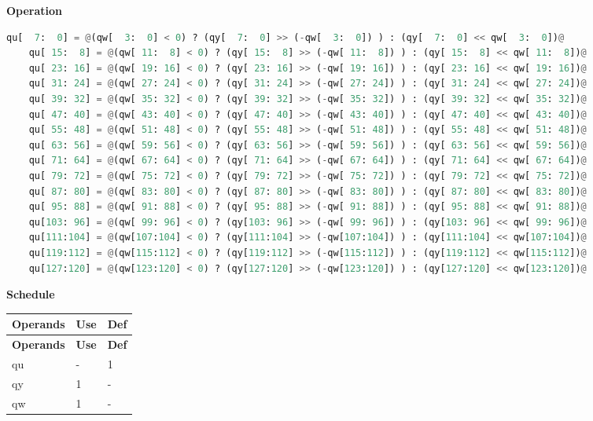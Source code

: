 \textbf{Operation}\\
\begin{lstlisting}[language=Python, escapechar=@]
    qu[  7:  0] = @(qw[  3:  0] < 0) ? (qy[  7:  0] >> (-qw[  3:  0]) ) : (qy[  7:  0] << qw[  3:  0])@
    qu[ 15:  8] = @(qw[ 11:  8] < 0) ? (qy[ 15:  8] >> (-qw[ 11:  8]) ) : (qy[ 15:  8] << qw[ 11:  8])@
    qu[ 23: 16] = @(qw[ 19: 16] < 0) ? (qy[ 23: 16] >> (-qw[ 19: 16]) ) : (qy[ 23: 16] << qw[ 19: 16])@
    qu[ 31: 24] = @(qw[ 27: 24] < 0) ? (qy[ 31: 24] >> (-qw[ 27: 24]) ) : (qy[ 31: 24] << qw[ 27: 24])@
    qu[ 39: 32] = @(qw[ 35: 32] < 0) ? (qy[ 39: 32] >> (-qw[ 35: 32]) ) : (qy[ 39: 32] << qw[ 35: 32])@
    qu[ 47: 40] = @(qw[ 43: 40] < 0) ? (qy[ 47: 40] >> (-qw[ 43: 40]) ) : (qy[ 47: 40] << qw[ 43: 40])@
    qu[ 55: 48] = @(qw[ 51: 48] < 0) ? (qy[ 55: 48] >> (-qw[ 51: 48]) ) : (qy[ 55: 48] << qw[ 51: 48])@
    qu[ 63: 56] = @(qw[ 59: 56] < 0) ? (qy[ 63: 56] >> (-qw[ 59: 56]) ) : (qy[ 63: 56] << qw[ 59: 56])@
    qu[ 71: 64] = @(qw[ 67: 64] < 0) ? (qy[ 71: 64] >> (-qw[ 67: 64]) ) : (qy[ 71: 64] << qw[ 67: 64])@
    qu[ 79: 72] = @(qw[ 75: 72] < 0) ? (qy[ 79: 72] >> (-qw[ 75: 72]) ) : (qy[ 79: 72] << qw[ 75: 72])@
    qu[ 87: 80] = @(qw[ 83: 80] < 0) ? (qy[ 87: 80] >> (-qw[ 83: 80]) ) : (qy[ 87: 80] << qw[ 83: 80])@
    qu[ 95: 88] = @(qw[ 91: 88] < 0) ? (qy[ 95: 88] >> (-qw[ 91: 88]) ) : (qy[ 95: 88] << qw[ 91: 88])@
    qu[103: 96] = @(qw[ 99: 96] < 0) ? (qy[103: 96] >> (-qw[ 99: 96]) ) : (qy[103: 96] << qw[ 99: 96])@
    qu[111:104] = @(qw[107:104] < 0) ? (qy[111:104] >> (-qw[107:104]) ) : (qy[111:104] << qw[107:104])@
    qu[119:112] = @(qw[115:112] < 0) ? (qy[119:112] >> (-qw[115:112]) ) : (qy[119:112] << qw[115:112])@
    qu[127:120] = @(qw[123:120] < 0) ? (qy[127:120] >> (-qw[123:120]) ) : (qy[127:120] << qw[123:120])@
\end{lstlisting}

\textbf{Schedule}\\
\begin{longtable}[c]{|l|l|l|}
    \hline
    \rowcolor{lightgray}
    \textbf{Operands} & \textbf{Use} & \textbf{Def} \\\hline
    \endfirsthead
    \hline
    \rowcolor{lightgray}
     \textbf{Operands} & \textbf{Use} & \textbf{Def} \\\hline
    \endhead
    \hline
    \endfoot

  qu & - & 1 \\\hline
  qy & 1 & - \\\hline
  qw & 1 & -

\end{longtable}

